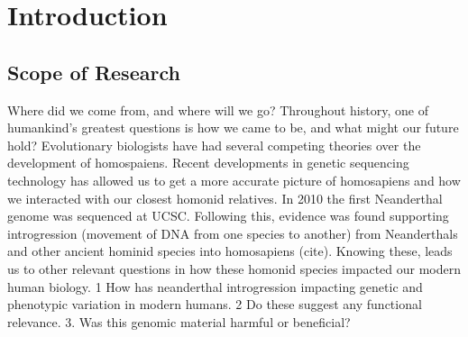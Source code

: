 
\chapter{Introduction}
\section{Scope of Research}
Where did we come from, and where will we go? Throughout history, one of humankind's greatest questions is how we came to be, and what might our future hold? Evolutionary biologists have had several competing theories over the development of homospaiens. 
Recent developments in genetic sequencing technology has allowed us to get a more accurate picture of homosapiens and how we interacted with our closest homonid relatives. In 2010 the first Neanderthal genome was sequenced at UCSC. Following this, evidence was found supporting introgression (movement of DNA from one species to another) from Neanderthals and other ancient hominid species into homosapiens (cite). Knowing these, leads us to other relevant questions in how these homonid species impacted our modern human biology. 1 How has neanderthal introgression impacting genetic and phenotypic variation in modern humans. 2 Do these suggest any functional relevance. 3. Was this genomic material harmful or beneficial? 

